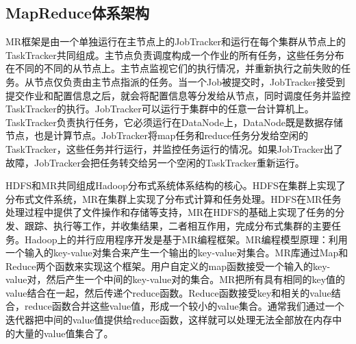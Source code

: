   \subsection{MapReduce体系架构}
  MR框架是由一个单独运行在主节点上的JobTracker和运行在每个集群从节点上的TaskTracker共同组成。主节点负责调度构成一个作业的所有任务，这些任务分布在不同的不同的从节点上。主节点监视它们的执行情况，并重新执行之前失败的任务。从节点仅负责由主节点指派的任务。当一个Job被提交时，JobTracker接受到提交作业和配置信息之后，就会将配置信息等分发给从节点，同时调度任务并监控TaskTracker的执行。JobTracker可以运行于集群中的任意一台计算机上。TaskTracker负责执行任务，它必须运行在DataNode上，DataNode既是数据存储节点，也是计算节点。JobTracker将map任务和reduce任务分发给空闲的TaskTracker，这些任务并行运行，并监控任务运行的情况。如果JobTracker出了故障，JobTracker会把任务转交给另一个空闲的TaskTracker重新运行。

  HDFS和MR共同组成Hadoop分布式系统体系结构的核心。HDFS在集群上实现了分布式文件系统，MR在集群上实现了分布式计算和任务处理。HDFS在MR任务处理过程中提供了文件操作和存储等支持，MR在HDFS的基础上实现了任务的分发、跟踪、执行等工作，并收集结果，二者相互作用，完成分布式集群的主要任务。Hadoop上的并行应用程序开发是基于MR编程框架。MR编程模型原理：利用一个输入的key-value对集合来产生一个输出的key-value对集合。MR库通过Map和Reduce两个函数来实现这个框架。用户自定义的map函数接受一个输入的key-value对，然后产生一个中间的key-value对的集合。MR把所有具有相同的key值的value结合在一起，然后传递个reduce函数。Reduce函数接受key和相关的value结合，reduce函数合并这些value值，形成一个较小的value集合。通常我们通过一个迭代器把中间的value值提供给reduce函数，这样就可以处理无法全部放在内存中的大量的value值集合了。

